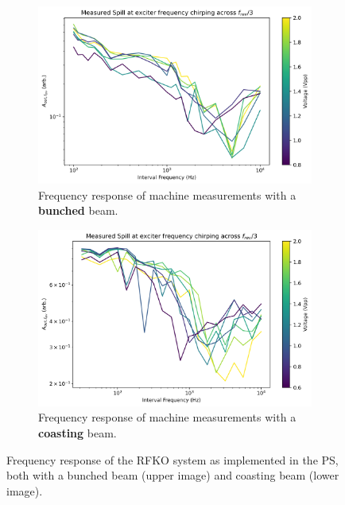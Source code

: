 \documentclass[11pt]{report}
\begin{document}
\begin{figure}
  \centering
  \begin{subfigure}[b]{0.9\linewidth}
    \includegraphics*[width=\linewidth]{machine_rf_on.png}
    \caption{Frequency response of machine measurements with a \textbf{bunched} beam.}\label{machine_rf_on}
  \end{subfigure}
  \begin{subfigure}[b]{0.9\linewidth}
    \includegraphics*[width=\linewidth]{machine_rf_off.png}
    \caption{Frequency response of machine measurements with a \textbf{coasting} beam.}\label{machine_rf_off}
  \end{subfigure}
  \caption{Frequency response of the RFKO system as implemented in the PS, both with a bunched beam (upper image) and coasting beam (lower image).}\label{fig:freq_response_machine}
\end{figure}
\end{document}
